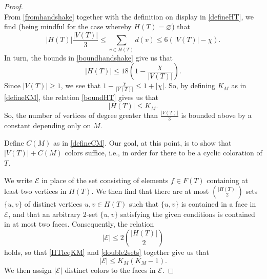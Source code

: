\documentclass[10pt,a4paper]{amsart}
\begin{document}
\begin{proof}
\begin{equation}
\end{equation}
 From \eqref{fromhandshake} together with the definition on display in \eqref{defineHT}, we find (being mindful for the case whereby
 $H(T) = \varnothing$) that 
\begin{equation}\label{boundhandshake} 
 \left| H(T) \right| \frac{ \left| V(T) \right| }{3} 
 \leq \sum_{v \in H(T)} d(v) \leq 6 \left( \left| V(T) \right| - \chi \right). 
\end{equation}
 In turn, the bounds in \eqref{boundhandshake} 
 give us that 
\begin{equation}\label{boundHT} 
 \left| H(T) \right| \leq 18 \left( 1 - \frac{\chi}{ \left| V(T) \right| } \right). 
\end{equation}
 Since $\left| V(T) \right| \geq 1$, we see that 
 $1 - \frac{\chi}{ \left| V(T) \right| } \leq 1 + \left| \chi \right|$. 
 So, by defining $K_{M}$ as in \eqref{defineKM}, 
 the relation \eqref{boundHT} gives us that 
\begin{equation}\label{HTleqKM} 
 \left| H(T) \right| \leq K_{M}.
\end{equation} 
 So, the number of vertices of degree greater than $\frac{\left| V(T) \right|}{3}$
 is bounded above by a constant depending only on $M$. 

 Define $C(M)$ as in \eqref{defineCM}. 
 Our goal, at this point, is to show that $\left| V(T) \right| + C(M)$
 colors suffice, i.e., in order for there to 
 be a cyclic coloration of $T$. 

 We write $\mathcal{E}$ in place of the set consisting of elements $f \in F(T)$ containing at least two vertices in $H(T)$. We then find that 
 there are at most $\binom{ \left| H(T) \right| }{2}$ 
 sets $\{ u, v \}$ of distinct vertices $u, v \in H(T)$
 such that $\{ u, v \}$ is contained in a face in $\mathcal{E}$, 
 and that an arbitrary 2-set $\{ u, v \}$ satisfying the given conditions
 is contained in at most two faces. Consequently, the relation 
\begin{equation}\label{double2sets} 
 \left| \mathcal{E} \right| \leq 2 \binom{ \left| H(T) \right| }{2} 
\end{equation}
 holds, so that \eqref{HTleqKM} and \eqref{double2sets} together give us that 
\begin{equation}\label{boundexceptional} 
 \left| \mathcal{E} \right| \leq K_{M} \left( K_{M} - 1 \right). 
\end{equation}
 We then assign $\left| \mathcal{E} \right|$
 distinct colors to the faces in $\mathcal{E}$. 


\end{proof}
\end{document}
